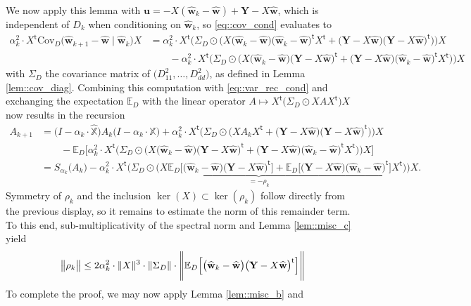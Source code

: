\documentclass{article}
\newcommand*{\E}{\mathbb{E}} %
\newcommand*{\bbE}{\mathbb{E}}
\newcommand*{\bbX}{\mathbb{X}}
\newcommand*{\bfY}{\mathbf{Y}}
\newcommand*{\bfu}{\mathbf{u}}
\newcommand*{\bfw}{\mathbf{w}}
\newcommand*{\tran}{^{\mathsf{t}}}
\DeclarePairedDelimiter{\norm}{\lVert}{\rVert}
\newcommand*{\Cov}{\mathrm{Cov}}
\newcommand{\whweight}{\widehat{\bfw}}
\newcommand{\whbbX}{\widehat{\bbX}}
\begin{document}
We now apply this lemma with $\bfu = - X (\whweight_k - \whweight) + \bfY - X
\whweight$, which is independent of $D_k$ when conditioning on $\whweight_k$, so
\eqref{eq::cov_cond} evaluates to \begin{align*}
  \alpha_k^2 \cdot X\tran \Cov_D\big(\whweight_{k + 1} - \whweight \mid
  \whweight_k\big) X &= \alpha_k^2 \cdot X\tran \Bigg(\Sigma_D \odot \Big(X
  \big(\whweight_k - \whweight\big) \big(\whweight_k - \whweight\big)\tran
  X\tran + \big(\bfY - X \whweight\big) \big(\bfY - X
  \whweight\big)\tran\Big)\Bigg) X\\
  &\qquad - \alpha_k^2 \cdot X\tran \Bigg(\Sigma_D \odot \Big(X \big(\whweight_k
  - \whweight\big) \big(\bfY - X \whweight\big)\tran + \big(\bfY - X
  \whweight\big) \big(\whweight_k - \whweight\big)\tran X\tran\Big)\Bigg) X
\end{align*} with $\Sigma_D$ the covariance matrix of $\big(D_{11}^2, \ldots,
D_{dd}^2\big)$, as defined in Lemma \ref{lem::cov_diag}. Combining this
computation with \eqref{eq::var_rec_cond} and exchanging the expectation
$\bbE_D$ with the linear operator $A \mapsto X\tran \big(\Sigma_D \odot X A
X\tran \big) X$ now results in the recursion \begin{align}
  A_{k + 1} &= \big(I - \alpha_k \cdot \whbbX\big) A_k \big(I - \alpha_k \cdot
  \whbbX\big) + \alpha_k^2 \cdot X\tran \Bigg(\Sigma_D \odot \bigg(X A_k X\tran
  + \big(\bfY - X \whweight\big) \big(\bfY - X \whweight\big)\tran\bigg)\Bigg) X
  \nonumber\\
  &\qquad - \E_D\Bigg[\alpha_k^2 \cdot X\tran \Bigg(\Sigma_D \odot \Big(X
  \big(\whweight_k - \whweight\big) \big(\bfY - X \whweight\big)\tran +
  \big(\bfY - X \whweight\big) \big(\whweight_k - \whweight\big)\tran
  X\tran\Big)\Bigg) X\Bigg] \nonumber\\
  &= S_{\alpha_k}\big(A_k\big) - \underbrace{\alpha_k^2 \cdot X\tran
  \Bigg(\Sigma_D \odot \bigg(X \E_D\Big[\big(\whweight_k - \whweight\big)
  \big(\bfY - X \whweight\big)\tran\Big] + \E_D\Big[\big(\bfY - X \whweight\big)
  \big(\whweight_k - \whweight\big)\tran\Big] X\tran\Big)\Bigg) X}_{= - \rho_k}.
  \label{eq::rec_op_rem}
\end{align} Symmetry of $\rho_k$ and the inclusion $\ker(X) \subset
\ker(\rho_k)$ follow directly from the previous display, so it remains to
estimate the norm of this remainder term. To this end, sub-multiplicativity of
the spectral norm and Lemma \ref{lem::misc_c} yield \begin{align*}
  \norm[\big]{\rho_k} \leq 2 \alpha_k^2 \cdot \norm{X}^3 \cdot \norm{\Sigma_D}
  \cdot \norm[\Bigg]{\E_D\Big[\big(\whweight_k - \whweight\big) \big(\bfY - X
  \whweight\big)\tran\Big]}
\end{align*} To complete the proof, we may now apply Lemma \ref{lem::misc_b} and
\end{document}

